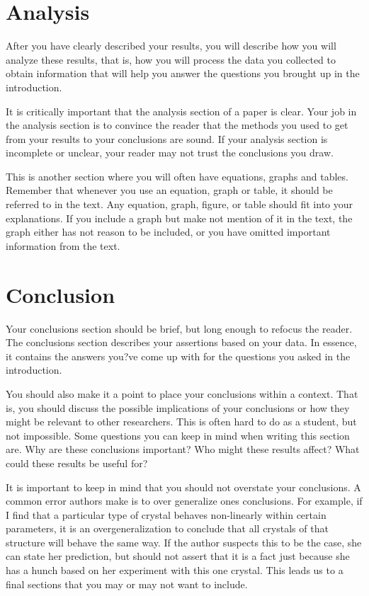 \documentclass[preprint,pre,floats,aps,amsmath,amssymb]{revtex4}
\begin{document}
\section{Analysis}
\label{sec:analysis}

After you have clearly described your results, you will describe how you will analyze these results, that is, how you will process the data you collected to obtain information that will help you answer the questions you brought up in the introduction.

It is critically important that the analysis section of a paper is clear. Your job in the analysis section is to convince the reader that the methods you used to get from your results to your conclusions are sound. If your analysis section is incomplete or unclear, your reader may not trust the conclusions you draw.

This is another section where you will often have equations, graphs and tables. Remember that whenever you use an equation, graph or table, it should be referred to in the text. Any equation, graph, figure, or table should fit into your explanations. If you include a graph but make not mention of it in the text, the graph either has not reason to be included, or you have omitted important information from the text.

\section{Conclusion}
\label{sec:conclusion}

Your conclusions section should be brief, but long enough to refocus the reader. The conclusions section describes your assertions based on your data. In essence, it contains the answers you?ve come up with for the questions you asked in the introduction.

You should also make it a point to place your conclusions within a context. That is, you should discuss the possible implications of your conclusions or how they might be relevant to other researchers. This is often hard to do as a student, but not impossible. Some questions you can keep in mind when writing this section are. Why are these conclusions important? Who might these results affect? What could these results be useful for?

It is important to keep in mind that you should not overstate your conclusions. A common error authors make is to over generalize ones conclusions. For example, if I find that a particular type of crystal behaves non-linearly within certain parameters, it is an overgeneralization to conclude that all crystals of that structure will behave the same way. If the author suspects this to be the case, she can state her prediction, but should not assert that it is a fact just because she has a hunch based on her experiment with this one crystal. This leads us to a final sections that you may or may not want to include.
\end{document}
